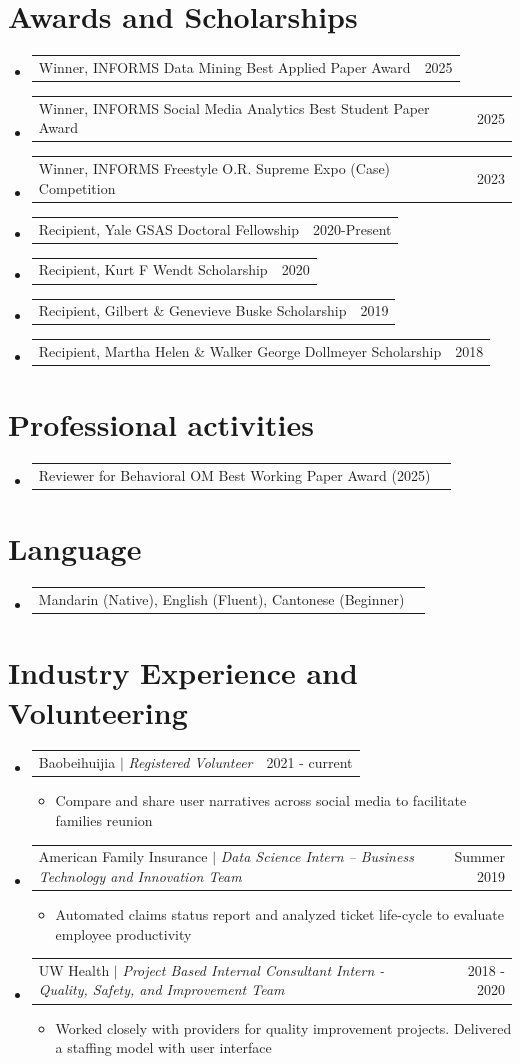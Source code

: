 \documentclass[letterpaper,11pt]{article}
\makeatletter
\newcommand{\resumeItem}[1]{
  \item\small{
    {#1 \vspace{-2pt}}
  }
}
\newcommand{\resumeProjectHeading}[2]{
    \item
    \begin{tabular*}{0.97\textwidth}{l@{\extracolsep{\fill}}r}
      \small#1 & #2 \\
    \end{tabular*}\vspace{-7pt}
}
\newcommand{\resumeSubHeadingListStart}{\begin{itemize}[leftmargin=0.15in, label={}]}
\newcommand{\resumeSubHeadingListEnd}{\end{itemize}}
\newcommand{\resumeItemListStart}{\begin{itemize}}
\newcommand{\resumeItemListEnd}{\end{itemize}\vspace{-5pt}}
\makeatother
\begin{document}
\section{Awards and Scholarships}
\resumeSubHeadingListStart
        \resumeProjectHeading{Winner, INFORMS Data Mining Best Applied Paper Award}{2025}
        \resumeProjectHeading
        {Winner, INFORMS Social Media Analytics Best Student Paper Award}{2025}
        \resumeProjectHeading
        {Winner, INFORMS Freestyle O.R. Supreme Expo (Case) Competition}{2023}
        \resumeProjectHeading
        {Recipient, Yale GSAS Doctoral Fellowship}{2020-Present}
        \resumeProjectHeading
        {Recipient, Kurt F Wendt Scholarship}{2020}
        \resumeProjectHeading
        {Recipient, Gilbert \& Genevieve Buske Scholarship}{2019}
        \resumeProjectHeading
        {Recipient, Martha Helen \& Walker George Dollmeyer Scholarship}{2018}

\resumeSubHeadingListEnd

\section{Professional activities}
    \resumeSubHeadingListStart

        \resumeProjectHeading
        {Reviewer for Behavioral OM Best Working Paper Award (2025)}{}
          
    \resumeSubHeadingListEnd

\section{Language}
    \resumeSubHeadingListStart
        \resumeProjectHeading
        {Mandarin (Native), English (Fluent), Cantonese (Beginner)}{}
    \resumeSubHeadingListEnd
    
\section{Industry Experience and Volunteering}
    \resumeSubHeadingListStart
        \resumeProjectHeading
        {Baobeihuijia $|$ \footnotesize\emph{
Registered Volunteer}}{2021 - current}
        \resumeItemListStart
            \resumeItem{Compare and share user narratives across social media to facilitate families reunion}
          \resumeItemListEnd
          
        \resumeProjectHeading
        {American Family Insurance $|$ \footnotesize\emph{Data Science Intern – Business Technology and Innovation Team}}{Summer 2019}
        \resumeItemListStart
            \resumeItem{Automated claims status report and analyzed ticket life-cycle to evaluate employee productivity}
          \resumeItemListEnd
        \resumeProjectHeading
        {UW Health $|$ \footnotesize\emph{
Project Based Internal Consultant Intern - Quality, Safety, and Improvement Team}}{2018 - 2020}
        \resumeItemListStart
            \resumeItem{Worked closely with providers for quality improvement projects. Delivered a staffing model with user interface}
          \resumeItemListEnd
    \resumeSubHeadingListEnd
\end{document}
